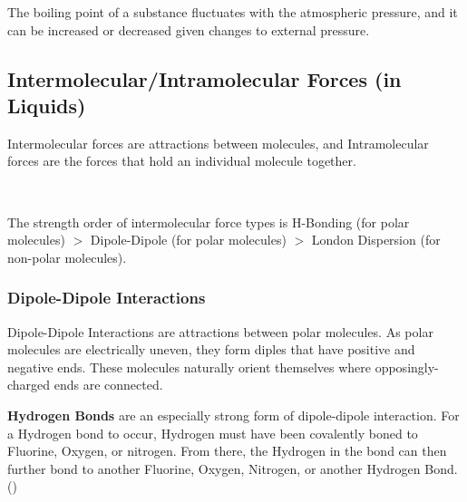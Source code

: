 \noindent
The boiling point of a substance fluctuates with the atmospheric pressure, and it can be increased or decreased given changes to external pressure.

\subsection{Intermolecular/Intramolecular Forces (in Liquids)}

\begin{defn}
Intermolecular forces are attractions between molecules, and Intramolecular forces are the forces that hold an individual molecule together.
\end{defn}

\noindent
{} \\

\noindent
{}

\noindent
The strength order of intermolecular force types is H-Bonding (for polar molecules) $>$ Dipole-Dipole (for polar molecules) $>$ London Dispersion (for non-polar molecules).

\subsubsection{Dipole-Dipole Interactions}

\begin{defn}
Dipole-Dipole Interactions are attractions between polar molecules. As polar molecules are electrically uneven, they form diples that have positive and negative ends. These molecules naturally orient themselves where opposingly-charged ends are connected.
\end{defn}

\noindent
\textbf{Hydrogen Bonds} are an especially strong form of dipole-dipole interaction. For a Hydrogen bond to occur, Hydrogen must have been covalently boned to Fluorine, Oxygen, or nitrogen. From there, the Hydrogen in the bond can then further bond to another Fluorine, Oxygen, Nitrogen, or another Hydrogen Bond. () \\

\noindent
{}

